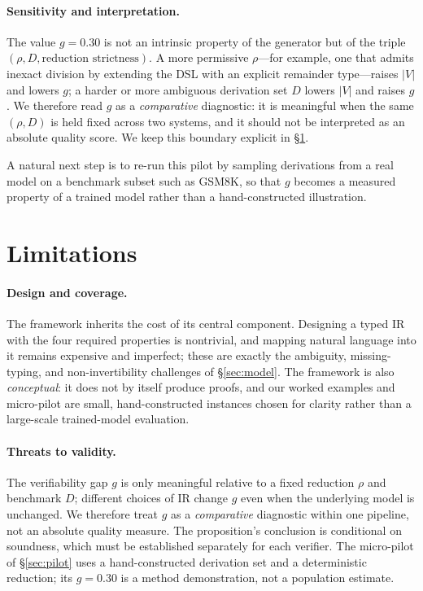 \documentclass[11pt]{article}
\theoremstyle{definition}
\theoremstyle{plain}
\theoremstyle{remark}
\begin{document}
\paragraph{Sensitivity and interpretation.}
The value $g=0.30$ is not an intrinsic property of the generator but of the triple
$(\rho, D, \text{reduction strictness})$. A more permissive $\rho$---for example, one that
admits inexact division by extending the DSL with an explicit remainder type---raises $|V|$
and lowers $g$; a harder or more ambiguous derivation set $D$ lowers $|V|$ and raises $g$.
We therefore read $g$ as a \emph{comparative} diagnostic: it is meaningful when the same
$(\rho, D)$ is held fixed across two systems, and it should not be interpreted as an absolute
quality score. We keep this boundary explicit in \S\ref{sec:limitations}.

A natural next step is to re-run this
pilot by sampling derivations from a real model on a benchmark subset such as GSM8K, so
that $g$ becomes a measured property of a trained model rather than a hand-constructed
illustration.

\section{Limitations}\label{sec:limitations}
\paragraph{Design and coverage.}
The framework inherits the cost of its central component. Designing a typed IR with the four
required properties is nontrivial, and mapping natural language into it remains expensive and
imperfect; these are exactly the ambiguity, missing-typing, and non-invertibility challenges
of \S\ref{sec:model}. The framework is also \emph{conceptual}: it does not by itself produce
proofs, and our worked examples and micro-pilot are small, hand-constructed
instances chosen for clarity rather than a large-scale trained-model evaluation.

\paragraph{Threats to validity.}
The verifiability gap $g$ is only meaningful relative to a fixed reduction $\rho$ and
benchmark $D$; different choices of IR change $g$ even when the underlying model is unchanged.
We therefore treat $g$ as a \emph{comparative} diagnostic within one pipeline, not an absolute
quality measure. The proposition's conclusion is conditional on soundness, which must be
established separately for each verifier. The micro-pilot of \S\ref{sec:pilot} uses a
hand-constructed derivation set and a deterministic reduction; its $g=0.30$ is a method
demonstration, not a population estimate.
\end{document}
